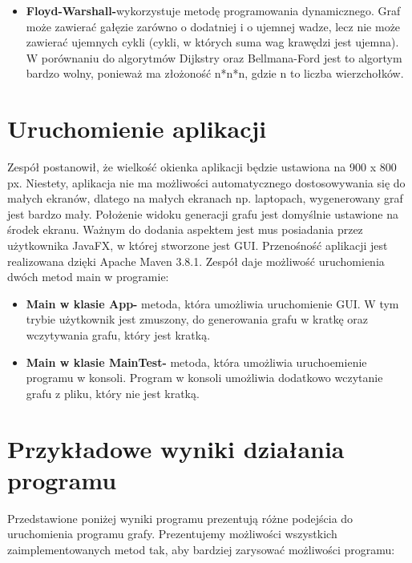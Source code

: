 \documentclass[10pt]{article}
\begin{document}
\begin{itemize}
    \item \textbf{Floyd-Warshall-}wykorzystuje metodę programowania dynamicznego. Graf może zawierać gałęzie zarówno o dodatniej i o ujemnej wadze, lecz nie może zawierać ujemnych cykli (cykli, w których suma wag krawędzi jest ujemna). W porównaniu do algorytmów Dijkstry oraz Bellmana-Ford jest to algortym bardzo wolny, ponieważ ma złożoność n*n*n, gdzie n to liczba wierzchołków.
\end{itemize}
\section{Uruchomienie aplikacji}
Zespół postanowił, że wielkość okienka aplikacji będzie ustawiona na 900 x 800 px. Niestety, aplikacja nie ma możliwości automatycznego dostosowywania się do małych ekranów, dlatego na małych ekranach np. laptopach, wygenerowany graf jest bardzo mały. Położenie widoku generacji grafu jest domyślnie ustawione na środek ekranu. Ważnym do dodania aspektem jest mus posiadania przez użytkownika JavaFX, w której stworzone jest GUI. Przenośność aplikacji jest realizowana dzięki Apache Maven 3.8.1. Zespół daje możliwość uruchomienia dwóch metod main w programie:
\begin{itemize}
    \item \textbf{Main w klasie App-} metoda, która umożliwia uruchomienie GUI. W tym trybie użytkownik jest zmuszony, do generowania grafu w kratkę oraz wczytywania grafu, który jest kratką.
    \item \textbf{Main w klasie MainTest-} metoda, która umożliwia uruchoemienie programu w konsoli. Program w konsoli umożliwia dodatkowo wczytanie grafu z pliku, który nie jest kratką. 
\end{itemize}
\newpage
\section{Przykładowe wyniki działania programu}
Przedstawione poniżej wyniki programu prezentują różne podejścia do uruchomienia programu grafy. Prezentujemy możliwości wszystkich zaimplementowanych metod tak, aby bardziej zarysować możliwości programu:
\end{document}
